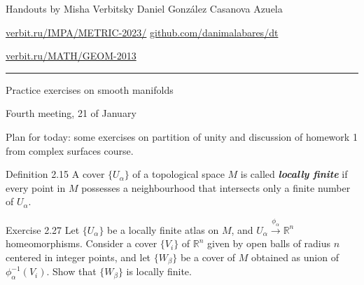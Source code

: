 \usepackage{multicol}
%



\begin{minipage}{\textwidth}
	\begin{minipage}{1\textwidth}
	Handouts by Misha Verbitsky	 \hfill Daniel González Casanova Azuela
		
		{\small \href{http://verbit.ru/IMPA/METRIC-2023/}{verbit.ru/IMPA/METRIC-2023/} \hfill\href{https://github.com/danimalabares/dt}{github.com/danimalabares/dt}

		 \href{http://verbit.ru/MATH/GEOM-2013/}{verbit.ru/MATH/GEOM-2013}}
	\end{minipage}
\end{minipage}\vspace{.2cm}\hrule

\vspace{10pt}
{\huge Practice exercises on smooth manifolds}

{\large Fourth meeting, 21 of January}
\vspace{1em}

Plan for today: some exercises on partition of unity and discussion of homework 1 from complex surfaces course.

\iffalse\begin{itemize}
\item Topological spaces (1)
\item Hausdorff spaces (1)
\item Compact spaces (1)
\item Smooth manifolds (4)
\item Embedded submanifolds (2)
\item Partition of unity (2)
\end{itemize}\fi

\begin{thing3}{Definition 2.15}\label{def:2.15}\leavevmode
A cover \(\{U_\alpha\}\) of a topological space \(M\) is called \textit{\textbf{locally finite}} if every point in \(M\) possesses a neighbourhood that intersects only a finite number of \(U_\alpha\).
\end{thing3}

\begin{thing4}{Exercise 2.27}\label{exer:2.27}\leavevmode
	Let \(\{U_\alpha\}\) be a locally finite atlas on \(M\), and \(U_\alpha\xrightarrow{\phi_\alpha}\mathbb{R}^n\) homeomorphisms. Consider a cover \(\{V_i\}\) of \( \mathbb{R}^n\) given by open balls of radius $n$ centered in integer points, and let \(\{ W_\beta\}\) be a cover of \(M\) {\color{2}obtained as union of \(\phi^{-1}_\alpha(V_i)\)}. Show that \(\{W_\beta\}\) is locally finite.
\end{thing4}


